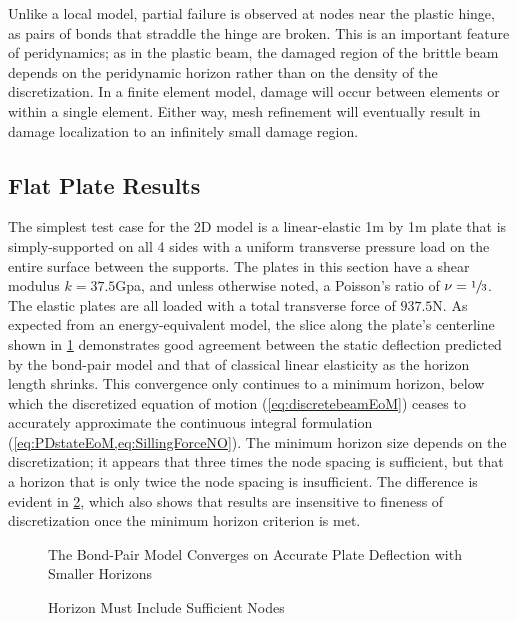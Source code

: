 Unlike a local model, partial failure is observed at nodes near the plastic hinge, as pairs of bonds that straddle the hinge are broken.
This is an important feature of peridynamics; as in the plastic beam, the damaged region of the brittle beam depends on the peridynamic horizon rather than on the density of the discretization.
In a finite element model, damage will occur between elements or within a single element.
Either way, mesh refinement will eventually result in damage localization to an infinitely small damage region.

\FloatBarrier
\subsection{Flat Plate Results}

The simplest test case for the 2D model is a linear-elastic 1m by 1m plate that is simply-supported on all 4 sides with a uniform transverse pressure load on the entire surface between the supports.  
The plates in this section have a shear modulus $k=37.5$Gpa, and unless otherwise noted, a Poisson's ratio of \(\nu = \sfrac{1}{3}\).
The elastic plates are all loaded with a total transverse force of $937.5$N.
As expected from an energy-equivalent model, the slice along the plate's centerline shown in \cref{fig:plate_convergence_h} demonstrates good agreement between the static deflection predicted by the bond-pair model and that of classical linear elasticity as the horizon length shrinks.  
This convergence only continues to a minimum horizon, below which the discretized equation of motion (\cref{eq:discretebeamEoM}) ceases to accurately approximate the continuous integral formulation (\cref{eq:PDstateEoM,eq:SillingForceNO}).  
The minimum horizon size depends on the discretization; it appears that three times the node spacing is sufficient, but that a horizon that is only twice the node spacing is insufficient.  
The difference is evident in \cref{fig:plate_minimum_h}, which also shows that results are insensitive to fineness of discretization once the minimum horizon criterion is met.
%
\begin{figure}[h]
  \centering
  \resizebox{0.6\linewidth}{!}{}
  \caption{The Bond-Pair Model Converges on Accurate Plate Deflection with Smaller Horizons}
  \label{fig:plate_convergence_h}
\end{figure}
%
\begin{figure}[h]
  \centering
  \resizebox{0.6\linewidth}{!}{}
  \caption{Horizon Must Include Sufficient Nodes}
  \label{fig:plate_minimum_h}
\end{figure}
